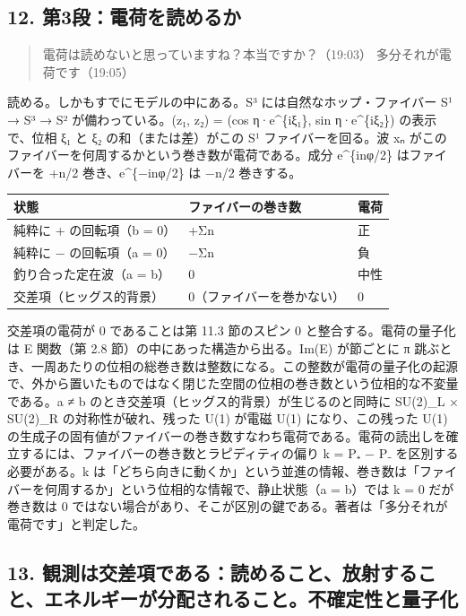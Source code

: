 \documentclass[
  a4paper,
]{ltjsarticle}
\newcounter{none} %
\begin{document}
\subsection{12.
第3段：電荷を読めるか}\label{ux7b2c3ux6bb5ux96fbux8377ux3092ux8aadux3081ux308bux304b}

\begin{quote}
電荷は読めないと思っていますね？本当ですか？（19:03）
多分それが電荷です（19:05）
\end{quote}

読める。しかもすでにモデルの中にある。S³ には自然なホップ・ファイバー S¹
→ S³ → S² が備わっている。(z₁, z₂) = (cos η·e\^{}\{iξ₁\}, sin
η·e\^{}\{iξ₂\}) の表示で、位相 ξ₁ と ξ₂ の和（または差）がこの S¹
ファイバーを回る。波 xₙ
がこのファイバーを何周するかという巻き数が電荷である。成分
e\^{}\{inφ/2\} はファイバーを +n/2 巻き、e\^{}\{−inφ/2\} は −n/2
巻きする。

{\def\LTcaptype{none} %
\begin{longtable}[]{@{}lll@{}}
\toprule\noalign{}
状態 & ファイバーの巻き数 & 電荷 \\
\midrule\noalign{}
\endhead
\bottomrule\noalign{}
\endlastfoot
純粋に + の回転項（b = 0） & +Σn & 正 \\
純粋に − の回転項（a = 0） & −Σn & 負 \\
釣り合った定在波（a = b） & 0 & 中性 \\
交差項（ヒッグス的背景） & 0（ファイバーを巻かない） & 0 \\
\end{longtable}
}

交差項の電荷が 0 であることは第 11.3 節のスピン 0
と整合する。電荷の量子化は E 関数（第 2.8
節）の中にあった構造から出る。Im(E) が節ごとに π
跳ぶとき、一周あたりの位相の総巻き数は整数になる。この整数が電荷の量子化の起源で、外から置いたものではなく閉じた空間の位相の巻き数という位相的な不変量である。a
≠ b のとき交差項（ヒッグス的背景）が生じるのと同時に SU(2)\_L × SU(2)\_R
の対称性が破れ、残った U(1) が電磁 U(1) になり、この残った U(1)
の生成子の固有値がファイバーの巻き数すなわち電荷である。電荷の読出しを確立するには、ファイバーの巻き数とラピディティの偏り
k = P₊ − P₋ を区別する必要がある。k
は「どちら向きに動くか」という並進の情報、巻き数は「ファイバーを何周するか」という位相的な情報で、静止状態（a
= b）では k = 0 だが巻き数は 0
ではない場合があり、そこが区別の鍵である。著者は「多分それが電荷です」と判定した。

\subsection{13.
観測は交差項である：読めること、放射すること、エネルギーが分配されること。不確定性と量子化}\label{ux89b3ux6e2cux306fux4ea4ux5deeux9805ux3067ux3042ux308bux8aadux3081ux308bux3053ux3068ux653eux5c04ux3059ux308bux3053ux3068ux30a8ux30cdux30ebux30aeux30fcux304cux5206ux914dux3055ux308cux308bux3053ux3068ux4e0dux78baux5b9aux6027ux3068ux91cfux5b50ux5316}
\end{document}
